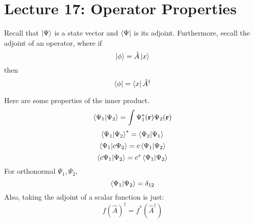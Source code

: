 \section{Lecture 17: Operator Properties}

Recall that $\ket{\Psi}$ is a state vector and $\bra{\Psi}$ is its adjoint.
Furthermore, eecall the adjoint of an operator, where if
\[ \ket{\phi} = \hat{A} \ket{x} \]
then
\[ \bra{\phi} = \bra{x} \hat{A}^{\dagger} \]

\begin{note}
    Here are some properties of the inner product.
    \[ \bra{\Psi_1}\ket{\Psi_2}  = \int \Psi_1^*(\mathbf{r}) \Psi_2(\mathbf{r}) \]
    \[ \bra{\Psi_1}\ket{\Psi_2}^* = \bra{\Psi_2}\ket{\Psi_1}\]
    \[ \bra{\Psi_1}\ket{c \Psi_2} = c \bra{\Psi_1}\ket{\Psi_2} \]
    \[ \bra{c \Psi_1}\ket{\Psi_2} = c^* \bra{\Psi_1}\ket{\Psi_2} \]
    For orthonormal $\Psi_1, \Psi_2$,
    \[ \bra{\Psi_1}\ket{\Psi_2} = \delta_{12} \]
    Also, taking the adjoint of a scalar function is just:
    \[ f(\hat{A})^{\dagger} = f^*(\hat{A}^{\dagger}) \]
\end{note}


